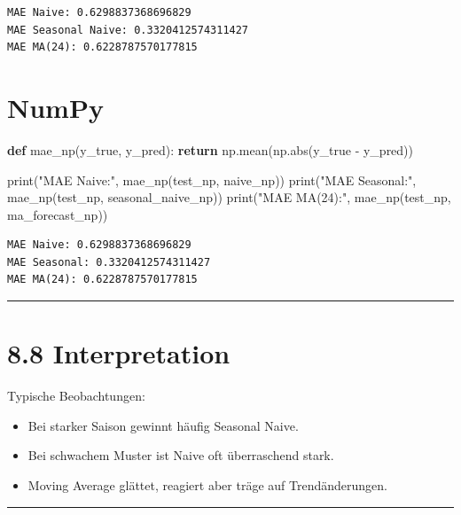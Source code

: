 \documentclass[
  ngerman,
  letterpaper,
  DIV=11]{scrreprt}
\newenvironment{Shaded}{\begin{snugshade}}{\end{snugshade}}
\newcommand{\BuiltInTok}[1]{\textcolor[rgb]{0.00,0.23,0.31}{#1}}
\newcommand{\ControlFlowTok}[1]{\textcolor[rgb]{0.00,0.23,0.31}{\textbf{#1}}}
\newcommand{\KeywordTok}[1]{\textcolor[rgb]{0.00,0.23,0.31}{\textbf{#1}}}
\newcommand{\NormalTok}[1]{\textcolor[rgb]{0.00,0.23,0.31}{#1}}
\newcommand{\OperatorTok}[1]{\textcolor[rgb]{0.37,0.37,0.37}{#1}}
\newcommand{\StringTok}[1]{\textcolor[rgb]{0.13,0.47,0.30}{#1}}
\providecommand{\tightlist}{%
  \setlength{\itemsep}{0pt}\setlength{\parskip}{0pt}}
\begin{document}
\begin{verbatim}
MAE Naive: 0.6298837368696829
MAE Seasonal Naive: 0.3320412574311427
MAE MA(24): 0.6228787570177815
\end{verbatim}

\section{NumPy}

\begin{Shaded}
\begin{Highlighting}[]
\KeywordTok{def}\NormalTok{ mae\_np(y\_true, y\_pred):}
    \ControlFlowTok{return}\NormalTok{ np.mean(np.}\BuiltInTok{abs}\NormalTok{(y\_true }\OperatorTok{{-}}\NormalTok{ y\_pred))}

\BuiltInTok{print}\NormalTok{(}\StringTok{"MAE Naive:"}\NormalTok{, mae\_np(test\_np, naive\_np))}
\BuiltInTok{print}\NormalTok{(}\StringTok{"MAE Seasonal:"}\NormalTok{, mae\_np(test\_np, seasonal\_naive\_np))}
\BuiltInTok{print}\NormalTok{(}\StringTok{"MAE MA(24):"}\NormalTok{, mae\_np(test\_np, ma\_forecast\_np))}
\end{Highlighting}
\end{Shaded}

\begin{verbatim}
MAE Naive: 0.6298837368696829
MAE Seasonal: 0.3320412574311427
MAE MA(24): 0.6228787570177815
\end{verbatim}

\begin{center}\rule{0.5\linewidth}{0.5pt}\end{center}

\section{8.8 Interpretation}\label{interpretation}

Typische Beobachtungen:

\begin{itemize}
\tightlist
\item
  Bei starker Saison gewinnt häufig Seasonal Naive.
\item
  Bei schwachem Muster ist Naive oft überraschend stark.
\item
  Moving Average glättet, reagiert aber träge auf Trendänderungen.
\end{itemize}

\begin{center}\rule{0.5\linewidth}{0.5pt}\end{center}
\end{document}
